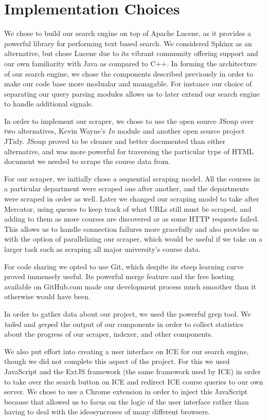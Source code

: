 \documentclass[12pt,letterpaper]{article}
\begin{document}
\section{Implementation Choices}
We chose to build our search engine on top of Apache Lucene, as it provides a powerful library for performing text based search. We considered Sphinx as an alternative, but chose Lucene due to its vibrant community offering support and our own familiarity with Java as compared to C++. In forming the architecture of our search engine, we chose the components described previously in order to make our code base more modualar and managable. For instance our choice of separating our query parsing modules allows us to later extend our search engine to handle additional signals.

In order to implement our scraper, we chose to use the open source JSoup over two alternatives, Kevin Wayne's \emph{In} module and another open source project JTidy. JSoup proved to be cleaner and better documented than either alternative, and was more powerful for traversing the particular type of HTML document we needed to scrape the course data from.

For our scraper, we initially chose a sequential scraping model. All the courses in a particular department were scraped one after another, and the departments were scraped in order as well. Later we changed our scraping model to take after Mercator, using queues to keep track of what URLs still must be scraped, and adding to them as more courses are discovered or as some HTTP requests failed. This allows us to handle connection failures more gracefully and also provides us with the option of parallelizing our scraper, which would be useful if we take on a larger task such as scraping all major university's course data.

For code sharing we opted to use Git, which despite its steep learning curve proved immensely useful. Its powerful merge feature and the free hosting available on GitHub.com made our development process much smoother than it otherwise would have been.

In order to gather data about our project, we used the powerful grep tool. We \emph{tail}ed and \emph{grep}ed the output of our components in order to collect statistics about the progress of our scraper, indexer, and other components.

We also put effort into creating a user interface on ICE for our search engine, though we did not complete this aspect of the project. For this we used JavaScript and the ExtJS framework (the same framework used by ICE) in order to take over the search button on ICE and redirect ICE course queries to our own server. We chose to use a Chrome extension in order to inject this JavaScript because that allowed us to focus on the logic of the user interface rather than having to deal with the ideosyncroses of many different browsers.
\end{document}
